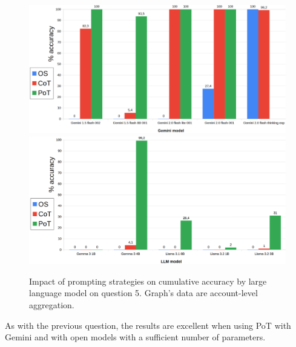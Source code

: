 \documentclass[12pt]{article}
\begin{document}
\begin{figure}[H]
    \centering
            \includegraphics[width=1\textwidth]{q103Gemini.png}
            \includegraphics[width=1\textwidth]{q103Other.png}
    \caption[Accuracy on Question 5 by LLM]{Impact of prompting strategies on cumulative accuracy by large language model on question 5. Graph's data are account-level aggregation.}
    \end{figure} 
As with the previous question, the results are excellent when using PoT with Gemini and with open models with a sufficient number of parameters.\\

\vspace{2cm}
\end{document}
